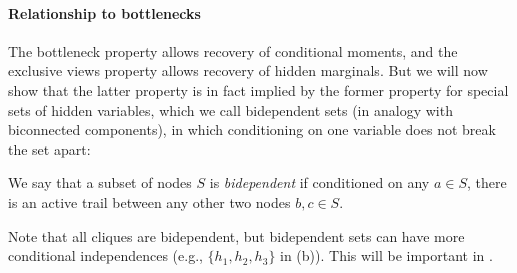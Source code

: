 \paragraph{Relationship to bottlenecks}


The bottleneck property allows recovery of conditional moments,
and the exclusive views property allows recovery of hidden marginals.
But we will now show that the latter property is in fact implied by the former
property for special sets of hidden variables, which we call bidependent
sets (in analogy with biconnected components),
in which conditioning on one variable does not break the set apart:
\begin{definition}
We say that a subset of nodes $S$ is \emph{bidependent} if
conditioned on any $a \in S$, there is an active trail between any other two nodes $b,c \in S$.
\end{definition}
Note that all cliques are bidependent, but bidependent sets can have more conditional independences
(e.g., $\{h_1,h_2,h_3\}$ in (b)).
This will be important in .

